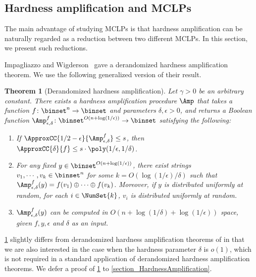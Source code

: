 \documentclass[11pt]{article}
\numberwithin{equation}{section}
\newtheorem{theorem}{Theorem}[section]
\theoremstyle{definition}
\theoremstyle{plain}
\begin{document}
%
%
%



\subsection{Hardness amplification and MCLPs}
\label{section_KtandHSG}

The main advantage of studying MCLPs is that
hardness amplification can be naturally regarded as a reduction
between two different MCLPs.
In this section, we present such reductions.

Impagliazzo and Wigderson~\cite{ImpagliazzoW97_stoc_conf} gave a derandomized hardness amplification theorem.
We use the following generalized version of their result.
\begin{theorem}
  [Derandomized hardness amplification]
  \label{lemma_HardnessAmplification}
  Let $\gamma > 0$ be an arbitrary constant.
  There exists a hardness amplification procedure $\Amp$
  that takes a function $f \colon \binset^n \to \binset$ and parameters $\delta, \epsilon > 0$,
  and returns
  a Boolean function
  $\Amp_{\epsilon, \delta}^f \colon \binset^{O(n + \log (1/\epsilon))} \to \binset$
  satisfying the following:
  \begin{enumerate}
    \item
          \label{item_AmpApprox}
          If $\ApproxCC{1/2 - \epsilon}{\Amp_{\epsilon, \delta}^f} \le s$,
          then
          $\ApproxCC{\delta}{f} \le s \cdot \poly(1/\epsilon, 1/\delta)$.
    \item  \label{item_AmpXOR}
          For any fixed $y \in \binset^{O(n + \log (1 / \epsilon))}$,
          there exist strings $v_1, \cdots, v_k \in \binset^{n}$
          for some $k = O(\log (1 / \epsilon) / \delta)$
          such that
          $\Amp_{\epsilon, \delta}^f(y) =  f(v_1) \oplus \cdots \oplus f(v_k)$.
          Moreover, if $y$ is distributed uniformly at random,
          for each $i \in \NumSet{k}$,
          $v_i$ is distributed uniformly at random.
    \item \label{item_AmpKS}
          $\Amp_{\epsilon, \delta}^f(y)$ can be computed in $O(n + \log (1 / \delta) + \log (1 / \epsilon))$ space,
          given $f, y, \epsilon$ and $\delta$ as an input.
  \end{enumerate}
\end{theorem}
\cref{lemma_HardnessAmplification} slightly differs from derandomized hardness amplification theorems of \cite{ImpagliazzoW97_stoc_conf, HealyVV06_siamcomp_journals} in that
we are also interested in the case when the hardness parameter $\delta$ is $o(1)$,
which is not required in a standard application of derandomized hardness amplification theorems.
We defer a proof of \cref{lemma_HardnessAmplification} to \cref{section_HardnessAmplification}.
%
\end{document}

